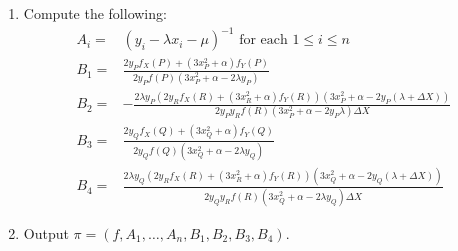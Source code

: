 \documentclass[11pt,letterpaper]{article}
\theoremstyle{definition}
\newcommand{\6}{\mathbf}
\newcommand{\7}{\mathcal}
\begin{document}
\begin{itemize}
\begin{enumerate}
\item Compute the following:
\begin{align}
A_i =& (y_i - \lambda x_i - \mu)^{-1}\text{ for each }1 \leq i \leq n \\
B_1 =& \frac{2y_Pf_X(P) + (3x_P^2+\alpha) f_Y(P)}{2y_Pf(P)(3x_P^2+\alpha - 2\lambda y_P)} \\
B_2 =& - \frac{2\lambda y_P(2y_Rf_X(R) + (3x_R^2+\alpha) f_Y(R))(3x_P^2+\alpha - 2y_P(\lambda + \Delta X))}{2y_Py_Rf(R)(3x_P^2+\alpha-2y_P \lambda )\Delta X} \\
B_3 =& \frac{2y_Qf_X(Q) + (3x_Q^2+\alpha) f_Y(Q)}{2y_Qf(Q)(3x_Q^2+\alpha - 2\lambda y_Q)} \\
B_4 =& \frac{2\lambda y_Q(2y_Rf_X(R) + (3x_R^2+\alpha)f_Y(R))(3x_Q^2+\alpha - 2y_Q(\lambda + \Delta X))}{2y_Qy_Rf(R)(3x_Q^2+\alpha  - 2\lambda y_Q) \Delta X}
\end{align}


\item Output $\pi = (f,  A_1, \ldots, A_n, B_1, B_2, B_3, B_4)$. 
\end{enumerate}



\end{itemize}
\end{document}
